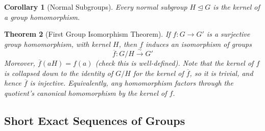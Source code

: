 \documentclass[12pt]{article}
\newtheorem{thm}{Theorem}[section]
\newtheorem{cor}[thm]{Corollary}
\theoremstyle{definition}
\theoremstyle{remark}
\numberwithin{equation}{section}
\newcommand\nsub{\trianglelefteq}
\DeclareMathOperator{\im}{im}
\begin{document}
\begin{cor}[Normal Subgroups]
        Every normal subgroup $H \nsub G$ is the kernel of a group homomorphism.
\end{cor}


\vspace{15pt}


\begin{thm}[First Group Isomorphism Theorem]
        If $f:G\rightarrow G'$ is a surjective group homomorphism, with kernel $H$, then $f$ induces an isomorphism of groups \begin{equation}
                \overline{f}: G/H \xrightarrow{\sim} G'
        \end{equation}
        Moreover, $\overline{f}(aH) = f(a)$ (check this is well-defined). Note that the kernel of $f$ is collapsed down to the identity of $G/H$ for the kernel of $\overline{f}$, so it is trivial, and hence $\overline{f}$ is injective. Equivalently, any homomorphism factors through the quotient's canonical homomorphism by the kernel of $f$.    
\end{thm}


\begin{figure}[H]
        \centering
\end{figure}

\vspace{15pt}
\subsection{Short Exact Sequences of Groups}
\end{document}

